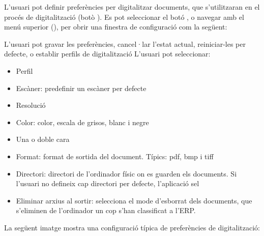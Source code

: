 \documentclass[letterpaper,11pt,catalan]{sphinxmanual}
\begin{document}

\begin{DUlineblock}{0em}
\item[] 
\end{DUlineblock}

L'usuari pot definir preferències per digitalitzar documents, que s'utilitzaran en
el procés de digitalització (botò ).
Es pot seleccionar el botó , o navegar amb el menú superior (),
per obrir una finestra de configuració com la següent:


L'usuari pot gravar les preferències, cancel·lar l'estat actual, reiniciar-les per defecte, o
establir perfils de digitalització
L'usuari pot seleccionar:
\begin{itemize}
\item {} 
Perfil

\item {} 
Escàner: predefinir un escàner per defecte

\item {} 
Resolució

\item {} 
Color: color, escala de grisos, blanc i negre

\item {} 
Una o doble cara

\item {} 
Format: format de sortida del document. Típics: pdf, bmp i tiff

\item {} 
Directori: directori de l'ordinador físic on es guarden els documents. Si l'usuari no defineix cap directori per defecte, l'aplicació sel

\item {} 
Eliminar arxius al sortir: selecciona el mode d'esborrat dels documents, que s'eliminen de l'ordinador un cop s'han classificat a l'ERP.

\end{itemize}

La següent imatge mostra una configuració típica de preferències de digitalització:
\end{document}
